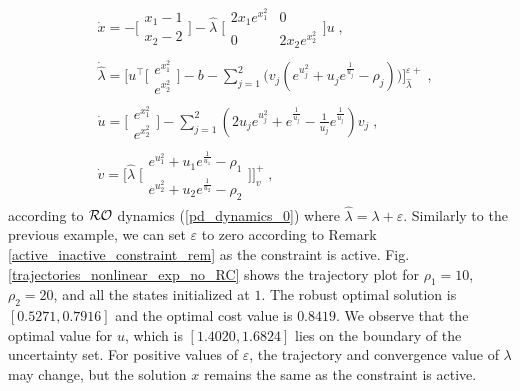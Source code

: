 \documentclass[journal,twoside,web]{ieeecolor}
\begin{document}
\begin{align*}
&\dot x=-\Big[\begin{array}{ccl} x_1-1 \\ x_2-2 \end{array}\Big]-\hat{\lambda}\; \Big[\begin{array}{cc} 2 x_1 e^{x_1^2} & 0 \\ 0 & 2 x_2 e^{x_2^2}\end{array}\Big]u \nonumber\;,\\
&\dot {\hat{\lambda}} = \Big[u^\top \Big[\begin{array}{cc} e^{x_1^2}\\ e^{x_2^2}\end{array}\Big]-b- \sum_{j=1}^2 \big(v_j(e^{u_j^2}+u_j e^{\frac{1}{u_j}}-\rho_j)\big)\Big]_{\hat{\lambda}}^{\varepsilon+}\nonumber\;,\\
&\dot u=\Big[\begin{array}{cc} e^{x_1^2}\\ e^{x_2^2}\end{array}\Big]- \sum_{j=1}^2(2u_j e^{u_j^2}+e^{\frac{1}{u_j}}-\frac{1}{u_j} e^{\frac{1}{u_j}}) v_j\nonumber\;,\\
&\dot v=\Big[\hat{\lambda}\; \Big[\begin{array}{cc} e^{u_1^2}+u_1 e^{\frac{1}{u_1}}-\rho_1 \\ e^{u_2^2}+u_2 e^{\frac{1}{u_2}}-\rho_2 \end{array}\Big] \Big]_{v}^+\nonumber\;,
\end{align*}
according to ${\cal RO}$ dynamics (\ref{pd_dynamics_0}) where $\hat{\lambda}=\lambda+\varepsilon$. Similarly to the previous example, we can set $\varepsilon$ to zero according to Remark \ref{active_inactive_constraint_rem} as the constraint is active. Fig. \ref{trajectories_nonlinear_exp_no_RC} shows the trajectory plot for $\rho_1=10$, $\rho_2=20$, and all the states initialized at $1$. The robust optimal solution is $[0.5271, 0.7916]$ and the optimal cost value is $0.8419$. We observe that the optimal value for $u$, which is $[1.4020, 1.6824]$ lies on the boundary of the uncertainty set. For positive values of $\varepsilon$, the trajectory and convergence value of $\lambda$ may change, but the solution $x$ remains the same as the constraint is active.
\end{document}
